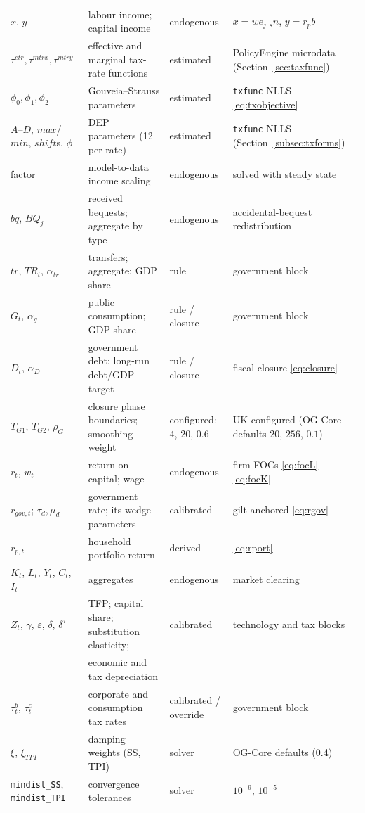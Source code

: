 \begin{table}[h]
{\begin{tabular}{llll}
$x$, $y$ & labour income; capital income & endogenous & $x = w e_{j,s} n$, $y = r_p b$ \\
$\tau^{etr},\tau^{mtrx},\tau^{mtry}$ & effective and marginal tax-rate functions & estimated & PolicyEngine microdata (Section~\ref{sec:taxfunc}) \\
$\phi_0,\phi_1,\phi_2$ & Gouveia--Strauss parameters & estimated & \texttt{txfunc} NLLS \eqref{eq:txobjective} \\
$A$--$D$, $max$/$min$, $shift$s, $\phi$ & DEP parameters (12 per rate) & estimated & \texttt{txfunc} NLLS (Section~\ref{subsec:txforms}) \\
factor & model-to-data income scaling & endogenous & solved with steady state \\
$bq$, $BQ_j$ & received bequests; aggregate by type & endogenous & accidental-bequest redistribution \\
$tr$, $TR_t$, $\alpha_{tr}$ & transfers; aggregate; GDP share & rule & government block \\
$G_t$, $\alpha_g$ & public consumption; GDP share & rule / closure & government block \\
$D_t$, $\alpha_D$ & government debt; long-run debt/GDP target & rule / closure & fiscal closure \eqref{eq:closure} \\
$T_{G1}$, $T_{G2}$, $\rho_G$ & closure phase boundaries; smoothing weight & configured: $4$, $20$, $0.6$ & UK-configured (OG-Core defaults $20$, $256$, $0.1$) \\
$r_t$, $w_t$ & return on capital; wage & endogenous & firm FOCs \eqref{eq:focL}--\eqref{eq:focK} \\
$r_{gov,t}$; $\tau_d,\mu_d$ & government rate; its wedge parameters & calibrated & gilt-anchored \eqref{eq:rgov} \\
$r_{p,t}$ & household portfolio return & derived & \eqref{eq:rport} \\
$K_t$, $L_t$, $Y_t$, $C_t$, $I_t$ & aggregates & endogenous & market clearing \\
$Z_t$, $\gamma$, $\varepsilon$, $\delta$, $\delta^\tau$ & TFP; capital share; substitution elasticity; & calibrated & technology and tax blocks \\
& economic and tax depreciation & & \\
$\tau^b_t$, $\tau^c_t$ & corporate and consumption tax rates & calibrated / override & government block \\
$\xi$, $\xi_{TPI}$ & damping weights (SS, TPI) & solver & OG-Core defaults (0.4) \\
\texttt{mindist\_SS}, \texttt{mindist\_TPI} & convergence tolerances & solver & $10^{-9}$, $10^{-5}$ \\
\bottomrule
\end{tabular}}
\end{table}

